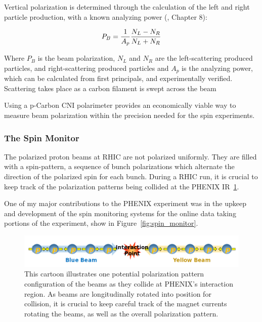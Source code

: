 Vertical polarization is determined through the calculation of the left and
right particle production, with a known analyzing power (\cite{RHIC2006},
Chapter 8):

\begin{equation}
  P_B = {{1}\over{A_p}}{{N_L-N_R}\over{N_L+N_R}}
  \label{eq:rhic_polarization}
\end{equation}

{\noindent}Where $P_B$ is the beam polarization, $N_L$ and $N_R$ are the
left-scattering produced particles, and right-scattering produced particles and
$A_p$ is the analyzing power, which can be calculated from first principals, and
experimentally verified. Scattering takes place as a carbon filament is swept
across the beam

Using a p-Carbon CNI polarimeter provides an economically viable way to measure
beam polarization within the precision needed for the spin experiments.

\subsubsection{The Spin Monitor}
\label{sec:the_spin_monitor}

The polarized proton beams at RHIC are not polarized uniformly. They are filled
with a spin-pattern, a sequence of bunch polarizations which alternate the
direction of the polarized spin for each bunch. During a RHIC run, it is crucial
to keep track of the polarization patterns being collided at the PHENIX
IR~\ref{fig:phenix_spin_collision}. 

One of my major contributions to the PHENIX experiment was in the upkeep and
development of the spin monitoring systems for the online data taking portions
of the experiment, show in Figure~\ref{fig:spin_monitor}.

\begin{figure}
  \centering
  \includegraphics[width=\linewidth]{./figures/phenix_spin_collision}
  \caption{
    This cartoon illustrates one potential polarization pattern configuration
    of the beams as they collide at PHENIX's interaction region.  As beams are
    longitudinally rotated into position for collision, it is crucial to keep
    careful track of the magnet currents rotating the beams, as well as the
    overall polarization pattern.
  }
  \label{fig:phenix_spin_collision}
\end{figure}

